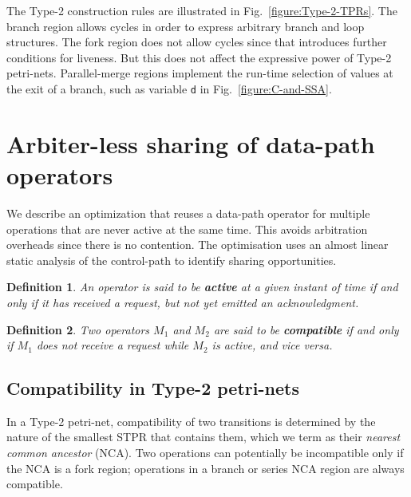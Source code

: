 \documentclass[conference]{IEEEtran}
\newtheorem{definition}{Definition}[section]
\begin{document}
The Type-2 construction rules are illustrated in
Fig.~\ref{figure:Type-2-TPRs}. The branch region allows cycles in
order to express arbitrary branch and loop structures. The fork region
does not allow cycles since that introduces further conditions for
liveness. But this does not affect the expressive power of Type-2
petri-nets. Parallel-merge regions implement the run-time selection of
values at the exit of a branch, such as variable {\tt d} in
Fig.~\ref{figure:C-and-SSA}.

\section{Arbiter-less sharing of data-path operators}

We describe an optimization that reuses a data-path operator for
multiple operations that are never active at the same time. This
avoids arbitration overheads since there is no contention. The
optimisation uses an almost linear static analysis of the control-path
to identify sharing opportunities.

\begin{definition} An operator is said to be {\bf active} at a given
instant of time if and only if it has received a request, but not
yet emitted an acknowledgment.
\end{definition}

\begin{definition} Two operators $M_1$ and $M_2$ are said to be {\bf
compatible} if and only if $M_1$ does not receive a request while
$M_2$ is active, and {\it vice versa}.
\end{definition}

\subsection{Compatibility in Type-2 petri-nets}

In a Type-2 petri-net, compatibility of two transitions is determined
by the nature of the smallest STPR that contains them, which we term
as their {\em nearest common ancestor} (NCA). Two operations can
potentially be incompatible only if the NCA is a fork region;
operations in a branch or series NCA region are always compatible.
\end{document}
